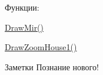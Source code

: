 Функции\+:
\begin{DoxyItemize}
\item \mbox{\hyperlink{_ozhaev_01_zaynudin_01cartoon_8cpp_a6484c6b48dd41123c803b7825f72c4c4}{Draw\+Mir()}}
\item \mbox{\hyperlink{_ozhaev_01_zaynudin_01cartoon_8cpp_a14dbbb9029429641d219e57cf2edd5c7}{Draw\+Zoom\+House1()}}
\end{DoxyItemize}

 \begin{DoxyNote}{Заметки}
Познание нового! 
\end{DoxyNote}
